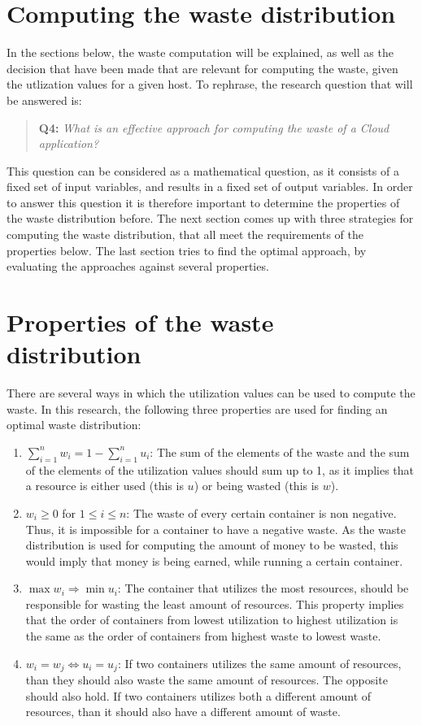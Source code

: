 \section{Computing the waste distribution} \label{sec:waste_into}
In the sections below, the waste computation will be explained, as well as the decision that have been made that are relevant for computing the waste, given the utlization values for a given host. To rephrase, the research question that will be answered is:

\begin{quote}
\textbf{Q4: }\textit{What is an effective approach for computing the waste of a Cloud application?}\\
\end{quote}

\noindent
This question can be considered as a mathematical question, as it consists of a fixed set of input variables, and results in a fixed set of output variables. In order to answer this question it is therefore important to determine the properties of the waste distribution before. The next section comes up with three strategies for computing the waste distribution, that all meet the requirements of the properties below. The last section tries to find the optimal approach, by evaluating the approaches against several properties.

\section{Properties of the waste distribution}
There are several ways in which the utilization values can be used to compute the waste. In this research, the following three properties are used for finding an optimal waste distribution:
\begin{enumerate}
    \item \textbf{$\sum_{i=1}^n w_i = 1 - \sum_{i=1}^n u_i $}: The sum of the elements of the waste and the sum of the elements of the utilization values should sum up to 1, as it implies that a resource is either used (this is $u$) or being wasted (this is $w$).
    \item \textbf{$w_i \geq 0$} for $1 \leq i \leq n$: The waste of every certain container is non negative. Thus, it is impossible for a container to have a negative waste. As the waste distribution is used for computing the amount of money to be wasted, this would imply that money is being earned, while running a certain container.
    \item \textbf{$\max w_i \Rightarrow \min u_i$}: The container that utilizes the most resources, should be responsible for wasting the least amount of resources. This property implies that the order of containers from lowest utilization to highest utilization is the same as the order of containers from highest waste to lowest waste. 
    \item \textbf{$w_i = w_j \iff u_i = u_j$}: If two containers utilizes the same amount of resources, than they should also waste the same amount of resources. The opposite should also hold. If two containers utilizes both a different amount of resources, than it should also have a different amount of waste.
\end{enumerate}

